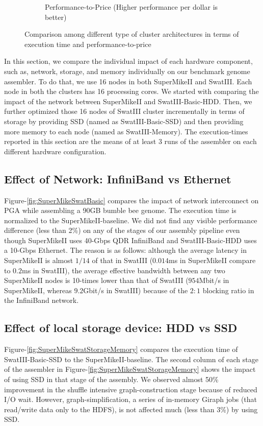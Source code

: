 \documentclass[10pt, conference, compsocconf]{IEEEtran}
\begin{document}
\begin{figure}[htb]
\begin{subfigure}[b]{0.5\textwidth}
                \caption{Performance-to-Price (Higher performance per dollar is better)}
                \label{fig:DifferentArchitecturesPerfPerDollar}
        \end{subfigure}
        \caption{Comparison among different type of cluster architectures in terms of execution time and performance-to-price}
  \label{fig:DifferentArchitectures}
  \vspace{-1em}
\end{figure}
In this section, we compare the individual impact of each hardware component, such as, network, storage, and memory individually on our benchmark genome assembler. To do that, we use 16 nodes in both SuperMikeII and SwatIII. Each node in both the clusters has 16 processing cores. We started with comparing the impact of the network between SuperMikeII and SwatIII-Basic-HDD. Then, we further optimized those 16 nodes of SwatIII cluster incrementally in terms of storage by providing SSD (named as SwatIII-Basic-SSD) and then providing more memory to each node (named as SwatIII-Memory). The execution-times reported in this section are the means of at least 3 runs of the assembler on each different hardware configuration.
\label{IndividualHWEffect}

\subsection {Effect of Network: InfiniBand vs Ethernet} \label{EffectOfNetwork}
Figure-\ref{fig:SuperMikeSwatBasic} compares the impact of network interconnect on PGA while assembling a 90GB bumble bee genome. The execution time is normalized to the SuperMikeII-baseline. We did not find any visible performance difference (less than 2\%) on any of the stages of our assembly pipeline even though SuperMikeII uses 40-Gbps QDR InfiniBand and SwatIII-Basic-HDD uses a 10-Gbps Ethernet. The reason is as follows: although the average latency in SuperMikeII is almost $1/14$ of that in SwatIII ($0.014$ms in SuperMikeII compare to $0.2$ms in SwatIII), the average effective bandwidth between any two SuperMikeII nodes is 10-times lower than that of SwatIII ($954$Mbit/s in SuperMikeII, whereas $9.2$Gbit/s in SwatIII) because of the $2:1$ blocking ratio in the InfiniBand network.  

\subsection {Effect of local storage device: HDD vs SSD} \label{EffectOfSSD}
Figure-\ref{fig:SuperMikeSwatStorageMemory} compares the execution time of SwatIII-Basic-SSD to the SuperMikeII-baseline. The second column of each stage of the assembler in Figure-\ref{fig:SuperMikeSwatStorageMemory} shows the impact of using SSD in that stage of the assembly. We observed almost 50\% improvement in the shuffle intensive graph-construction stage because of reduced I/O wait. However, graph-simplification, a series of in-memory Giraph jobs (that read/write data only to the HDFS), is not affected much (less than 3\%) by using SSD. 
 
\end{document}

